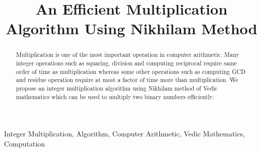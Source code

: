 \documentclass[conference]{IEEEtran}
\begin{document}
\title{An Efficient Multiplication Algorithm Using Nikhilam Method}
\author{
}

\maketitle


\begin{abstract}
Multiplication is one of the most important operation in computer arithmetic. Many integer operations such as squaring, division and computing reciprocal require same order of time as multiplication whereas some other operations such as computing GCD and residue operation require at most a factor of  time more than multiplication. We propose an integer multiplication algorithm using Nikhilam method of Vedic mathematics which can be used to multiply two binary numbers efficiently.
\end{abstract}

\begin{keywords}
 Integer Multiplication, Algorithm, Computer Arithmetic, Vedic Mathematics, Computation
\end{keywords}

 
\IEEEpeerreviewmaketitle
\end{document}
